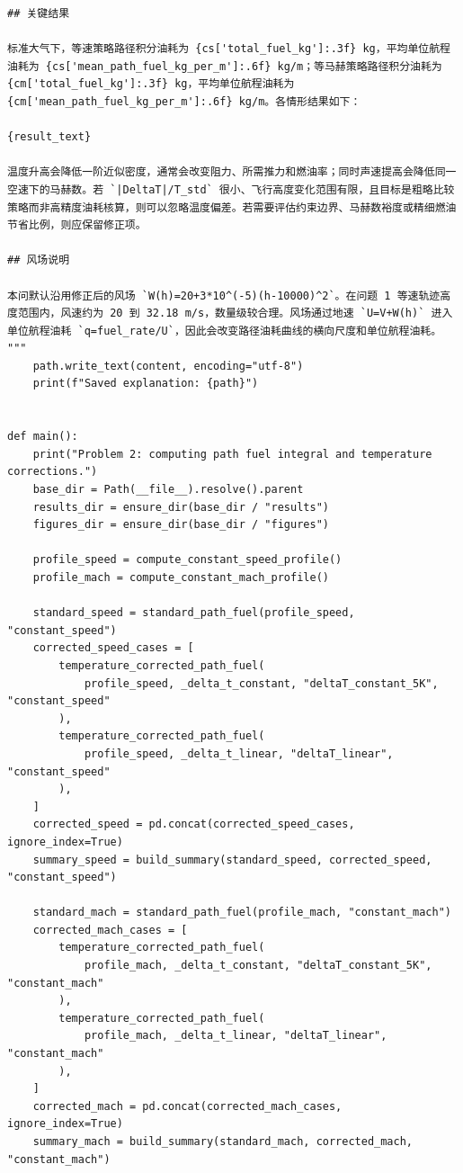 \documentclass[UTF8]{ctexart}
\begin{document}
\begin{center}
\begin{lstlisting}
## 关键结果

标准大气下，等速策略路径积分油耗为 {cs['total_fuel_kg']:.3f} kg，平均单位航程油耗为 {cs['mean_path_fuel_kg_per_m']:.6f} kg/m；等马赫策略路径积分油耗为 {cm['total_fuel_kg']:.3f} kg，平均单位航程油耗为 {cm['mean_path_fuel_kg_per_m']:.6f} kg/m。各情形结果如下：

{result_text}

温度升高会降低一阶近似密度，通常会改变阻力、所需推力和燃油率；同时声速提高会降低同一空速下的马赫数。若 `|DeltaT|/T_std` 很小、飞行高度变化范围有限，且目标是粗略比较策略而非高精度油耗核算，则可以忽略温度偏差。若需要评估约束边界、马赫数裕度或精细燃油节省比例，则应保留修正项。

## 风场说明

本问默认沿用修正后的风场 `W(h)=20+3*10^(-5)(h-10000)^2`。在问题 1 等速轨迹高度范围内，风速约为 20 到 32.18 m/s，数量级较合理。风场通过地速 `U=V+W(h)` 进入单位航程油耗 `q=fuel_rate/U`，因此会改变路径油耗曲线的横向尺度和单位航程油耗。
"""
    path.write_text(content, encoding="utf-8")
    print(f"Saved explanation: {path}")


def main():
    print("Problem 2: computing path fuel integral and temperature corrections.")
    base_dir = Path(__file__).resolve().parent
    results_dir = ensure_dir(base_dir / "results")
    figures_dir = ensure_dir(base_dir / "figures")

    profile_speed = compute_constant_speed_profile()
    profile_mach = compute_constant_mach_profile()

    standard_speed = standard_path_fuel(profile_speed, "constant_speed")
    corrected_speed_cases = [
        temperature_corrected_path_fuel(
            profile_speed, _delta_t_constant, "deltaT_constant_5K", "constant_speed"
        ),
        temperature_corrected_path_fuel(
            profile_speed, _delta_t_linear, "deltaT_linear", "constant_speed"
        ),
    ]
    corrected_speed = pd.concat(corrected_speed_cases, ignore_index=True)
    summary_speed = build_summary(standard_speed, corrected_speed, "constant_speed")

    standard_mach = standard_path_fuel(profile_mach, "constant_mach")
    corrected_mach_cases = [
        temperature_corrected_path_fuel(
            profile_mach, _delta_t_constant, "deltaT_constant_5K", "constant_mach"
        ),
        temperature_corrected_path_fuel(
            profile_mach, _delta_t_linear, "deltaT_linear", "constant_mach"
        ),
    ]
    corrected_mach = pd.concat(corrected_mach_cases, ignore_index=True)
    summary_mach = build_summary(standard_mach, corrected_mach, "constant_mach")


\end{lstlisting}
\end{center}
\end{document}
